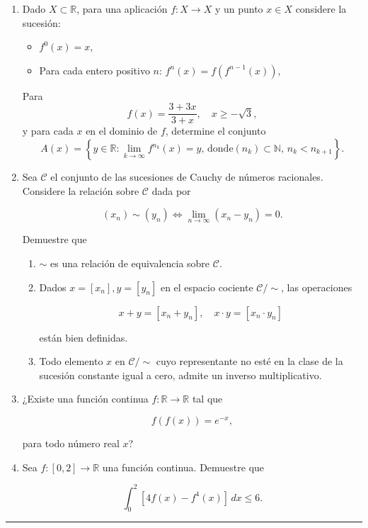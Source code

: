\documentclass{article}
\begin{document}
\begin{enumerate}

	\item Dado \( X \subset \mathbb{R} \), para una aplicación \( f : X \to X \) y un punto \( x \in X \) considere la sucesión:
	      \begin{itemize}[label=\textbullet]
		      \item \( f^0(x) = x \),
		      \item Para cada entero positivo \( n \): \( f^n(x) = f \left( f^{n-1}(x) \right) \),
	      \end{itemize}

	      Para
	      \[ f(x) = \frac{3 + 3x}{3 + x}, \quad x \geq -\sqrt{3}, \]
	      y para cada \( x \) en el dominio de \( f \), determine el conjunto
	      \[ A(x) = \left\{ y \in \mathbb{R}: \lim_{k \to \infty} f^{n_k}(x) = y, \, \text{donde} (n_k) \subset \mathbb{N}, \, n_k < n_{k+1} \right\}. \]



	\item Sea \(\mathscr{C}\) el conjunto de las sucesiones de Cauchy de números racionales. Considere la relación sobre \(\mathscr{C}\) dada por

	      \[ (x_n) \sim (y_n) \iff \lim_{n \to \infty} (x_n - y_n) = 0. \]

	      Demuestre que
	      \begin{enumerate}[label=\alph*)]
		      \item \(\sim\) es una relación de equivalencia sobre \(\mathscr{C}\).
		      \item  Dados \( x = [x_n], y = [y_n] \) en el espacio cociente \(\mathscr{C}/\sim\), las operaciones

		            \[ x + y = [x_n + y_n], \quad x \cdot y = [x_n \cdot y_n] \]

		            están bien definidas.
		      \item Todo elemento \( x \) en \(\mathscr{C}/\sim\) cuyo representante no esté en la clase de la sucesión constante igual a cero, admite un inverso multiplicativo.

	      \end{enumerate}

	\item ¿Existe una función continua \( f : \mathbb{R} \to \mathbb{R} \) tal que

	      \[ f(f(x)) = e^{-x}, \]

	      para todo número real \( x \)?

	\item Sea \( f : [0, 2] \to \mathbb{R} \) una función continua. Demuestre que

	      \[ \int_0^2 [4f(x) - f^4(x)] \, dx \leq 6. \]
\end{enumerate}

\vspace{1cm}

\rule{\textwidth}{0.4mm}
\end{document}
